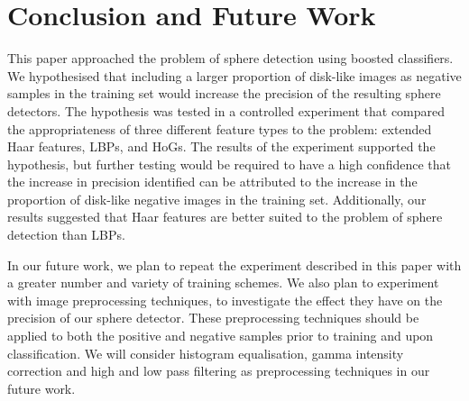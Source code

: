 \documentclass{llncs}
\begin{document}
	\section{Conclusion and Future Work} {
	\label{sec:conclusion}


		This paper approached the problem of sphere detection using boosted classifiers.
		We hypothesised that including a larger proportion of disk-like images as negative samples in the training set would increase the precision of the resulting sphere detectors.
		The hypothesis was tested in a controlled experiment that compared the appropriateness of three different feature types to the problem: extended Haar features, LBPs, and HoGs.
		The results of the experiment supported the hypothesis, but further testing would be required to have a high confidence that the increase in precision identified can be attributed to the increase in the proportion of disk-like negative images in the training set.
		Additionally, our results suggested that Haar features are better suited to the problem of sphere detection than LBPs.

		In our future work, we plan to repeat the experiment described in this paper with a greater number and variety of training schemes. We also plan to experiment with image preprocessing techniques, to investigate the effect they have on the precision of our sphere detector. These preprocessing techniques should be applied to both the positive and negative samples prior to training and upon classification. We will consider histogram equalisation, gamma intensity correction and high and low pass filtering \citep{gross2003image} as preprocessing techniques in our future work.

	}

	
	
\end{document}
